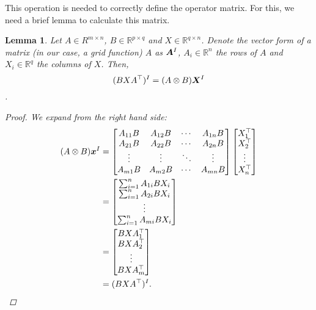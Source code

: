 \documentclass{article}
\renewcommand{\vec}{\vectorsym}
\newcommand{\R}{\mathbb{R}}
\newtheorem{lemma}{Lemma}
\begin{document}
This operation is needed to correctly define the operator matrix. For this, we need a brief lemma to calculate this matrix. 
\begin{lemma}
    Let $A\in R^{m\times n}$, $B\in \R^{p\times q}$ and $X\in \R^{q\times n}$. Denote the vector form of a matrix (in our case, a grid function) $A$ as $\vec A^I$, $A_i\in \R^n$ the rows of $A$ and $X_i\in \R^q$ the columns of $X$. Then, 
    $$(BXA^\top)^I = (A\otimes B)\vec X^I$$.
    \begin{proof}
        We expand from the right hand side:
        \begin{align*}
            (A\otimes B)\vec x^I &= \begin{bmatrix}
                A_{11}B & A_{12}B & \cdots & A_{1n}B \\
                A_{21}B & A_{22}B & \cdots & A_{2n}B \\
                \vdots & \vdots & \ddots & \vdots \\
                A_{m1}B & A_{m2}B & \cdots & A_{mn}B
            \end{bmatrix} \begin{bmatrix}
                X_1^\top \\
                X_2^\top \\
                \vdots \\
                X_n^\top
            \end{bmatrix} \\
            &= \begin{bmatrix}
                \sum_{i=1}^n A_{1i} B X_i\\
                \sum_{i=1}^n A_{2i} B X_i\\
                \vdots \\
                \sum_{i=1}^n A_{mi} B X_i
            \end{bmatrix}\\
            &= \begin{bmatrix}
                BXA_1^\top\\
                BXA_2^\top\\
                \vdots \\
                BXA_m^\top\\
            \end{bmatrix}\\
            &= (BXA^\top)^I.
        \end{align*}
    \end{proof}
\end{lemma}
\end{document}
